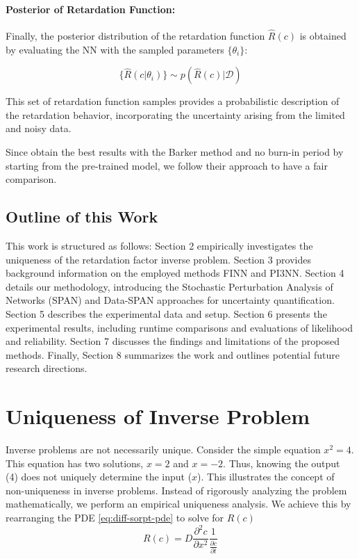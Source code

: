 \documentclass{article}
\begin{document}
\paragraph{Posterior of Retardation Function:}

Finally, the posterior distribution of the retardation function $\hat{R}(c)$ is obtained by evaluating the NN with the sampled parameters $\{\theta_i\}$:

\begin{equation*}
\{\hat{R}(c | \theta_i)\} \sim p(\hat{R}(c) | \mathcal{D})
\end{equation*}

This set of retardation function samples provides a probabilistic description of the retardation behavior, incorporating the uncertainty arising from the limited and noisy data.

Since \textcite{finn} obtain the best results with the Barker method and no burn-in period by starting from the pre-trained model, we follow their approach to have a fair comparison.



\subsection{Outline of this Work}
This work is structured as follows: Section 2 empirically investigates the uniqueness of the retardation factor inverse problem. Section 3 provides background information on the employed methods FINN and PI3NN. Section 4 details our methodology, introducing the Stochastic Perturbation Analysis of Networks (SPAN) and Data-SPAN approaches for uncertainty quantification. Section 5 describes the experimental data and setup. Section 6 presents the experimental results, including runtime comparisons and evaluations of likelihood and reliability. Section 7 discusses the findings and limitations of the proposed methods. Finally, Section 8 summarizes the work and outlines potential future research directions.



\section{Uniqueness of Inverse Problem}
\label{sec:uniqueness}
Inverse problems are not necessarily unique. Consider the simple equation $x^2 = 4$. This equation has two solutions, $x=2$ and $x=-2$. Thus, knowing the output (4) does not uniquely determine the input ($x$). This illustrates the concept of non-uniqueness in inverse problems. Instead of rigorously analyzing the problem mathematically, we perform an empirical uniqueness analysis. We achieve this by rearranging the PDE \eqref{eq:diff-sorpt-pde} to solve for $R(c)$
\begin{equation*}
    R(c) = D \frac{\partial^2 c}{\partial x^2} \frac{1}{\frac{\partial c}{\partial t}}
\end{equation*}
\end{document}
